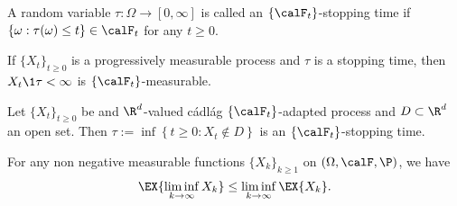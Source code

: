 
\begin{definition}
	A random variable $\tau:\Omega \to [0, \infty]$ is called an $\{\calF_{t}\}$-stopping time if
	$\{\omega: \tau(\omega)\leq t \}\in \calF_t$ for any $t\geq 0$.
\end{definition}
%
\begin{thm}
	If $\{ X_t\}_{t\geq 0}$ is a progressively measurable process and $\tau$ is a stopping time,
	then $X_t \1{\tau <\infty}$ is $\{\calF_t \}$-measurable.
\end{thm}
%
\begin{thm}
	Let $\{X_t \}_{t\geq 0}$ be and $\R^d$-valued cádlág $\{\calF_t\}$-adapted process and $D\subset \R^d$ an open set. 
	Then
	$
		\tau := \inf\left\{t \geq 0: X_t \notin D \right\}
	$
	is an $\{\calF_t\}$-stopping time.
\end{thm}
%
\begin{lem}[Fatou]
	For any non negative measurable functions $\{ X_k\}_{k\geq 1}$ on $(\Omega, \calF, \P)$, we have
	$$
	\EX{
		\liminf_{k\to\infty}
		X_k
	} \leq \liminf_{k\to\infty}\EX{X_k}.
	$$
\end{lem}
